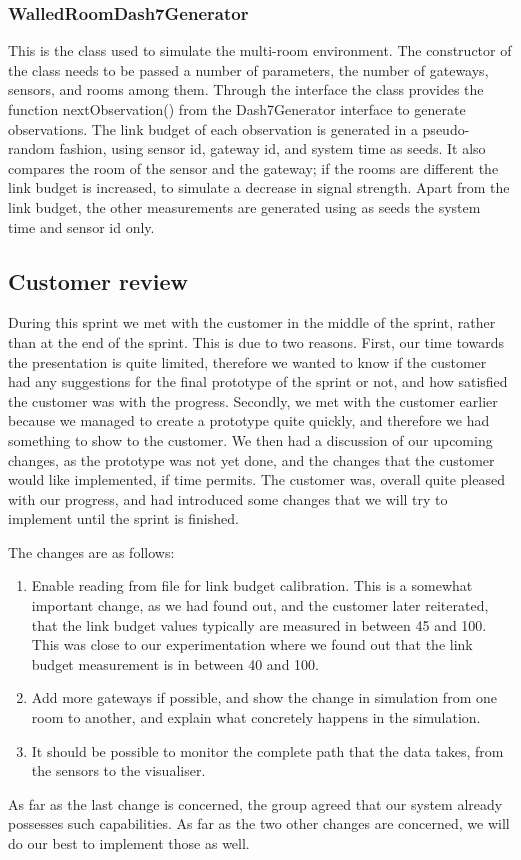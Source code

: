\documentclass[../document]{subfiles}
\begin{document}
\subsubsection{WalledRoomDash7Generator}
This is the class used to simulate the multi-room environment. The constructor of the class needs to be passed a number of parameters, the number of gateways, sensors, and rooms among them. Through the interface the class provides the function nextObservation() from the Dash7Generator interface to generate observations. The link budget of each observation is generated in a pseudo-random fashion, using sensor id, gateway id, and system time as seeds. It also compares the room of the sensor and the gateway; if the rooms are different the link budget is increased, to simulate a decrease in signal strength. Apart from the link budget, the other measurements are generated using as seeds the system time and sensor id only. 

\subsection{Customer review}

During this sprint we met with the customer in the middle of the sprint, rather than at the end of the sprint. This is due to two reasons. First, our time towards the presentation is quite limited, therefore we wanted to know if the customer had any suggestions for the final prototype of the sprint or not, and how satisfied the customer was with the progress. Secondly, we met with the customer earlier because we managed to create a prototype quite quickly, and therefore we had something to show to the customer. We then had a discussion of our upcoming changes, as the prototype was not yet done, and the changes that the customer would like implemented, if time permits. The customer was, overall quite pleased with our progress, and had introduced some changes that we will try to implement until the sprint is finished.

The changes are as follows:
\begin{enumerate}
	\item
	Enable reading from file for link budget calibration. This is a somewhat important change, as we had found out, and the customer later reiterated, that the link budget values typically are measured in between 45 and 100. This was close to our experimentation where we found out that the link budget measurement is in between 40 and 100.
	\item
	Add more gateways if possible, and show the change in simulation from one room to another, and explain what concretely happens in the simulation.
	\item
	It should be possible to monitor the complete path that the data takes, from the sensors to the visualiser.
\end{enumerate}
As far as the last change is concerned, the group agreed that our system already possesses such capabilities. As far as the two other changes are concerned, we will do our best to implement those as well.
\end{document}
